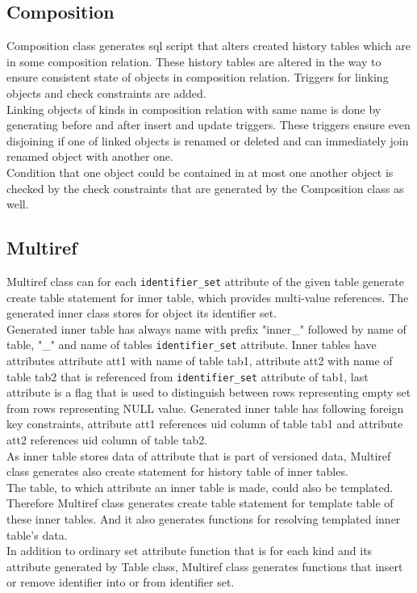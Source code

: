\documentclass[deska]{subfiles}
\begin{document}

\subsection{Composition}
Composition class generates sql script that alters created history tables which are in some composition relation. These history tables are altered in the way to ensure consistent state of objects in composition relation. Triggers for linking objects and check constraints are added.\\
Linking objects of kinds in composition relation with same name is done by generating before and after insert and update triggers. These triggers ensure even disjoining if one of linked objects is renamed or deleted and can immediately join renamed object with another one.\\
Condition that one object could be contained in at most one another object is checked by the check constraints that are generated by the Composition class as well.

\subsection{Multiref}
Multiref class can for each {\tt identifier\_set} attribute of the given table generate create table statement for inner table, which provides multi-value references. The generated inner class stores for object its identifier set.\\
Generated inner table has always name with prefix "inner\_" followed by name of table, "\_" and name of tables {\tt identifier\_set} attribute. Inner tables have attributes attribute att1 with name of table tab1, attribute att2 with name of table tab2 that is referenced from {\tt identifier\_set} attribute of tab1, last attribute is a flag that is used to distinguish between rows representing empty set from rows representing NULL value. Generated inner table has following foreign key constraints, attribute att1 references uid column of table tab1 and attribute att2 references uid column of table tab2.\\
As inner table stores data of attribute that is part of versioned data, Multiref class generates also create statement for history table of inner tables.\\ 
The table, to which attribute an inner table is made, could also be templated. Therefore Multiref class generates create table statement for template table of these inner tables. And it also generates functions for resolving templated inner table's data.\\
In addition to ordinary set attribute function that is for each kind and its attribute generated by Table class, Multiref class generates functions that insert or remove identifier into or from identifier set.
\end{document}
